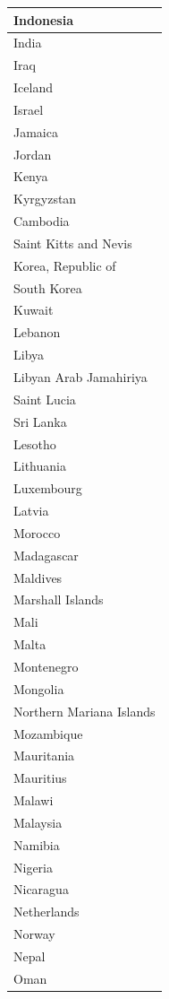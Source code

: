 \documentclass[]{article}
\begin{document}
\begin{table}
\begin{tabular}[t]{l}
\hline
Indonesia\\
\hline
India\\
\hline
Iraq\\
\hline
Iceland\\
\hline
Israel\\
\hline
Jamaica\\
\hline
Jordan\\
\hline
Kenya\\
\hline
Kyrgyzstan\\
\hline
Cambodia\\
\hline
Saint Kitts and Nevis\\
\hline
Korea, Republic of\\
\hline
South Korea\\
\hline
Kuwait\\
\hline
Lebanon\\
\hline
Libya\\
\hline
Libyan Arab Jamahiriya\\
\hline
Saint Lucia\\
\hline
Sri Lanka\\
\hline
Lesotho\\
\hline
Lithuania\\
\hline
Luxembourg\\
\hline
Latvia\\
\hline
Morocco\\
\hline
Madagascar\\
\hline
Maldives\\
\hline
Marshall Islands\\
\hline
Mali\\
\hline
Malta\\
\hline
Montenegro\\
\hline
Mongolia\\
\hline
Northern Mariana Islands\\
\hline
Mozambique\\
\hline
Mauritania\\
\hline
Mauritius\\
\hline
Malawi\\
\hline
Malaysia\\
\hline
Namibia\\
\hline
Nigeria\\
\hline
Nicaragua\\
\hline
Netherlands\\
\hline
Norway\\
\hline
Nepal\\
\hline
Oman\\
\hline

\end{tabular}
\end{table}
\end{document}
